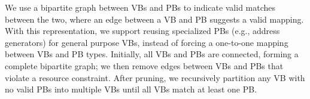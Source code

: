 We use a bipartite graph between VBs and PBs to indicate valid matches between the two, where an edge between a VB and PB suggests a valid mapping. 
With this representation, we support reusing specialized PBs (e.g., address generators) for general purpose VBs, instead of forcing a one-to-one mapping between VBs and PB types.
Initially, all VBs and PBs are connected, forming a complete bipartite graph; we then remove edges between VBs and PBs that violate a resource constraint. 
After pruning, we recursively partition any VB with no valid PBs into multiple VBs until all VBs match at least one PB.


